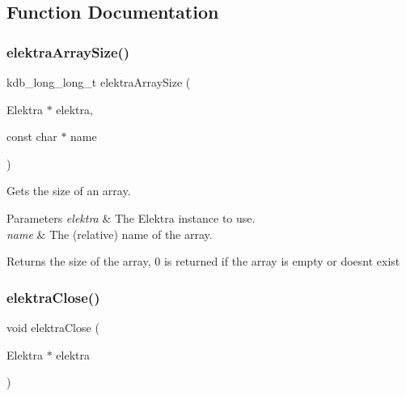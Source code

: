 \subsection{Function Documentation}
\mbox{\label{group__highlevel_gaf0413286c6faebdc951b739924111909}} 
\subsubsection{\texorpdfstring{elektra\+Array\+Size()}{elektraArraySize()}}
{\footnotesize\ttfamily kdb\+\_\+long\+\_\+long\+\_\+t elektra\+Array\+Size (\begin{DoxyParamCaption}\item[{Elektra $\ast$}]{elektra,  }\item[{const char $\ast$}]{name }\end{DoxyParamCaption})}



Gets the size of an array. 


\begin{DoxyParams}{Parameters}
{\em elektra} & The Elektra instance to use. \\
\hline
{\em name} & The (relative) name of the array. \\
\hline
\end{DoxyParams}
\begin{DoxyReturn}{Returns}
the size of the array, 0 is returned if the array is empty or doesn\textquotesingle{}t exist 
\end{DoxyReturn}
\mbox{\label{group__highlevel_ga9b688b7250e5f9d8ea6701cc2cc269af}} 
\subsubsection{\texorpdfstring{elektra\+Close()}{elektraClose()}}
{\footnotesize\ttfamily void elektra\+Close (\begin{DoxyParamCaption}\item[{Elektra $\ast$}]{elektra }\end{DoxyParamCaption})}



